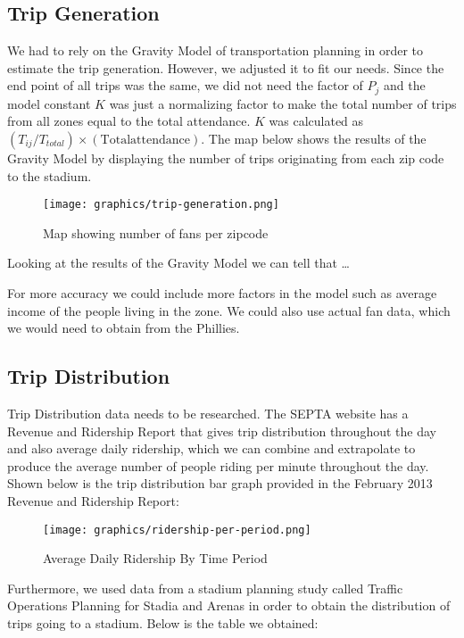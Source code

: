 
\subsection{Trip Generation}

We had to rely on the Gravity Model of transportation planning in order to estimate the trip generation. However, we adjusted it to fit our needs. Since the end point of all trips was the same, we did not need the factor of $P_j$ and the model constant $K$ was just a normalizing factor to make the total number of trips from all zones equal to the total attendance. $K$ was calculated as $(T_{ij}/T_{total}) \times (\mathrm{Total attendance})$. The map below shows the results of the Gravity Model by displaying the number of trips originating from each zip code to the stadium.

\begin{figure}[htp]
  \centering
  \texttt{[image: graphics/trip-generation.png]}
  \caption{Map showing number of fans per zipcode}
  \label{fig-trip-generation-results}
\end{figure}

Looking at the results of the Gravity Model we can tell that …

For more accuracy we could include more factors in the model such as  average income of the people living in the zone. We could also use actual fan data, which we would need to obtain from the Phillies.


\subsection{Trip Distribution}

Trip Distribution data needs to be researched. The SEPTA website has a Revenue and Ridership Report that gives trip distribution throughout the day and also average daily ridership, which we can combine and extrapolate to produce the average number of people riding per minute throughout the day. Shown below is the trip distribution bar graph provided in the February 2013 Revenue and Ridership Report:

\begin{figure}[htp]
  \centering
  \texttt{[image: graphics/ridership-per-period.png]}
  \caption{Average Daily Ridership By Time Period}
  \label{fig-ridership-per-period}
\end{figure}

Furthermore, we used data from a stadium planning study called Traffic Operations Planning for Stadia and Arenas in order to obtain the distribution of trips going to a stadium. Below is the table we obtained:

